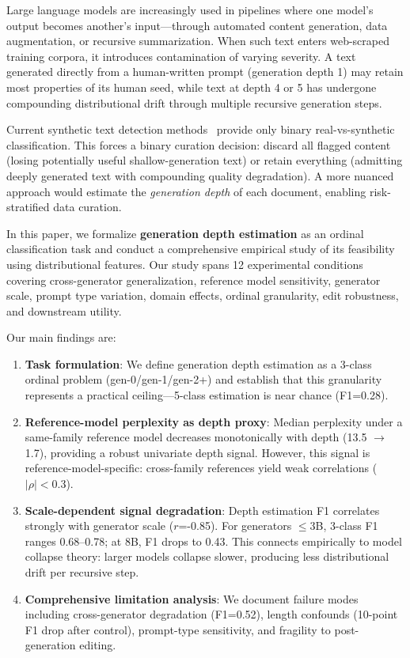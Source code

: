 \documentclass[11pt]{article}
\begin{document}
Large language models are increasingly used in pipelines where one model's output becomes another's input---through automated content generation, data augmentation, or recursive summarization.
When such text enters web-scraped training corpora, it introduces contamination of varying severity.
A text generated directly from a human-written prompt (generation depth 1) may retain most properties of its human seed, while text at depth 4 or 5 has undergone compounding distributional drift through multiple recursive generation steps.

Current synthetic text detection methods~\citep{mitchell2023detectgpt,bao2024fastdetectgpt,hans2024binoculars} provide only binary real-vs-synthetic classification.
This forces a binary curation decision: discard all flagged content (losing potentially useful shallow-generation text) or retain everything (admitting deeply generated text with compounding quality degradation).
A more nuanced approach would estimate the \emph{generation depth} of each document, enabling risk-stratified data curation.

In this paper, we formalize \textbf{generation depth estimation} as an ordinal classification task and conduct a comprehensive empirical study of its feasibility using distributional features.
Our study spans 12 experimental conditions covering cross-generator generalization, reference model sensitivity, generator scale, prompt type variation, domain effects, ordinal granularity, edit robustness, and downstream utility.

Our main findings are:

\begin{enumerate}
\item \textbf{Task formulation}: We define generation depth estimation as a 3-class ordinal problem (gen-0/gen-1/gen-2+) and establish that this granularity represents a practical ceiling---5-class estimation is near chance (F1=0.28).

\item \textbf{Reference-model perplexity as depth proxy}: Median perplexity under a same-family reference model decreases monotonically with depth (13.5 $\to$ 1.7), providing a robust univariate depth signal. However, this signal is reference-model-specific: cross-family references yield weak correlations ($|\rho|<0.3$).

\item \textbf{Scale-dependent signal degradation}: Depth estimation F1 correlates strongly with generator scale ($r$=-0.85). For generators $\leq$3B, 3-class F1 ranges 0.68--0.78; at 8B, F1 drops to 0.43. This connects empirically to model collapse theory: larger models collapse slower, producing less distributional drift per recursive step.

\item \textbf{Comprehensive limitation analysis}: We document failure modes including cross-generator degradation (F1=0.52), length confounds (10-point F1 drop after control), prompt-type sensitivity, and fragility to post-generation editing.
\end{enumerate}
\end{document}

